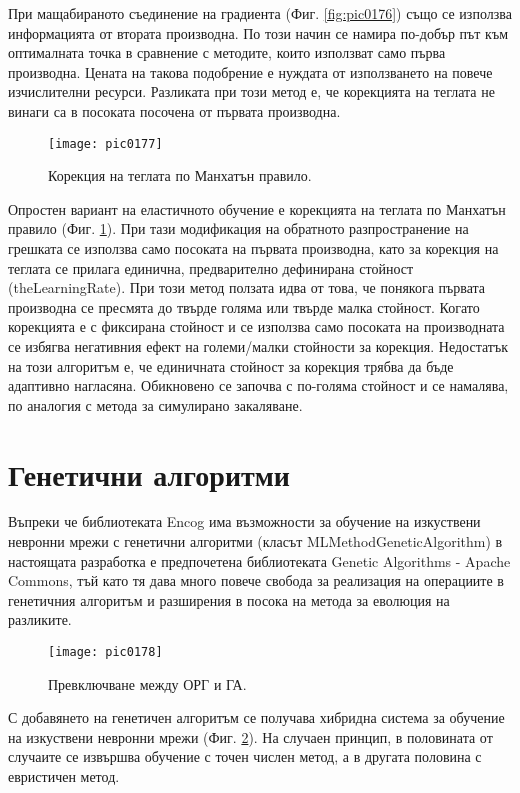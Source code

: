 При мащабираното съединение на градиента (Фиг. \ref{fig:pic0176}) също се използва информацията от втората производна. По този начин се намира по-добър път към оптималната точка в сравнение с методите, които използват само първа производна. Цената на такова подобрение е нуждата от използването на повече изчислителни ресурси. Разликата при този метод е, че корекцията на теглата не винаги са в посоката посочена от първата производна. 

\begin{figure}[h]
  \centering
  \texttt{[image: pic0177]}
  \caption{Корекция на теглата по Манхатън правило.}
\label{fig:pic0177}
\end{figure}
\FloatBarrier

Опростен вариант на еластичното обучение е корекцията на теглата по Манхатън правило (Фиг. \ref{fig:pic0177}). При тази модификация на обратното разпространение на грешката се използва само посоката на първата производна, като за корекция на теглата се прилага единична, предварително дефинирана стойност (theLearningRate). При този метод ползата идва от това, че понякога първата производна се пресмята до твърде голяма или твърде малка стойност. Когато корекцията е с фиксирана стойност и се използва само посоката на производната се избягва негативния ефект на големи/малки стойности за корекция. Недостатък на този алгоритъм е, че единичната стойност за корекция трябва да бъде адаптивно нагласяна. Обикновено се започва с по-голяма стойност и се намалява, по аналогия с метода за симулирано закаляване. 

\section{Генетични алгоритми}

Въпреки че библиотеката Encog има възможности за обучение на изкуствени невронни мрежи с генетични алгоритми (класът MLMethodGeneticAlgorithm) в настоящата разработка е предпочетена библиотеката Genetic Algorithms - Apache Commons, тъй като тя дава много повече свобода за реализация на операциите в генетичния алгоритъм и разширения в посока на метода за еволюция на разликите. 

\begin{figure}[h]
  \centering
  \texttt{[image: pic0178]}
  \caption{Превключване между ОРГ и ГА.}
\label{fig:pic0178}
\end{figure}
\FloatBarrier

С добавянето на генетичен алгоритъм се получава хибридна система за обучение на изкуствени невронни мрежи (Фиг. \ref{fig:pic0178}). На случаен принцип, в половината от случаите се извършва обучение с точен числен метод, а в другата половина с евристичен метод. 

